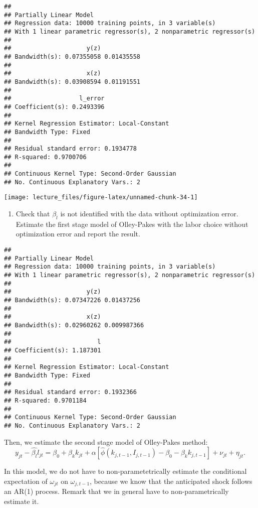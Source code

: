 \documentclass[
]{book}
\providecommand{\tightlist}{%
  \setlength{\itemsep}{0pt}\setlength{\parskip}{0pt}}
\begin{document}
\begin{verbatim}
## 
## Partially Linear Model
## Regression data: 10000 training points, in 3 variable(s)
## With 1 linear parametric regressor(s), 2 nonparametric regressor(s)
## 
##                     y(z)           
## Bandwidth(s): 0.07355058 0.01435558
## 
##                     x(z)           
## Bandwidth(s): 0.03908594 0.01191551
## 
##                   l_error
## Coefficient(s): 0.2493396
## 
## Kernel Regression Estimator: Local-Constant
## Bandwidth Type: Fixed
## 
## Residual standard error: 0.1934778
## R-squared: 0.9700706
## 
## Continuous Kernel Type: Second-Order Gaussian
## No. Continuous Explanatory Vars.: 2
\end{verbatim}

\begin{center}\texttt{[image: lecture\_files/figure-latex/unnamed-chunk-34-1]} \end{center}

\begin{enumerate}
\def\labelenumi{\arabic{enumi}.}
\setcounter{enumi}{3}
\tightlist
\item
  Check that \(\beta_l\) is not identified with the data without optimization error. Estimate the first stage model of Olley-Pakes with the labor choice without optimization error and report the result.
\end{enumerate}

\begin{verbatim}
## 
## Partially Linear Model
## Regression data: 10000 training points, in 3 variable(s)
## With 1 linear parametric regressor(s), 2 nonparametric regressor(s)
## 
##                     y(z)           
## Bandwidth(s): 0.07347226 0.01437256
## 
##                     x(z)            
## Bandwidth(s): 0.02960262 0.009987366
## 
##                        l
## Coefficient(s): 1.187301
## 
## Kernel Regression Estimator: Local-Constant
## Bandwidth Type: Fixed
## 
## Residual standard error: 0.1932366
## R-squared: 0.9701184
## 
## Continuous Kernel Type: Second-Order Gaussian
## No. Continuous Explanatory Vars.: 2
\end{verbatim}

Then, we estimate the second stage model of Olley-Pakes method:
\[
y_{jt} - \hat{\beta_l} l_{jt} = \beta_0 + \beta_k k_{jt} + \alpha[\hat{\phi}(k_{j, t - 1}, I_{j, t - 1}) - \beta_0 - \beta_k k_{j, t-1}] + \nu_{jt} + \eta_{jt}.
\]

In this model, we do not have to non-parametetrically estimate the conditional expectation of \(\omega_{jt}\) on \(\omega_{j, t - 1}\), because we know that the anticipated shock follows an AR(1) process. Remark that we in general have to non-parametrically estimate it.
\end{document}
